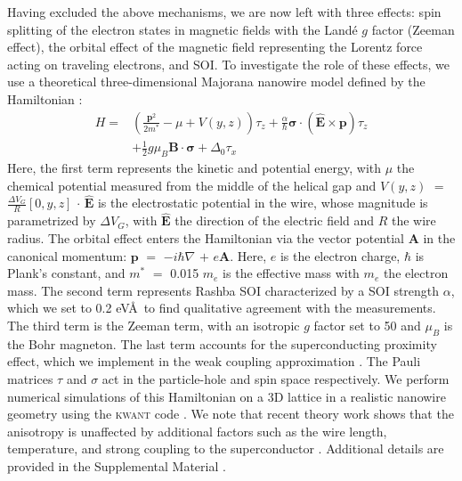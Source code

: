 Having excluded the above mechanisms, we are now left with three effects: spin splitting of the electron \mbox{states} in magnetic fields with the Land\'e $g$ factor (Zeeman eff\mbox{ect)}, the orbital effect of the magnetic field representing the Lorentz force acting on traveling electrons, and SOI.
To investigate the role of these effects, we use a theoretical three-dimensional Majorana nanowire model defined by the Hamiltonian \cite{Lutchyn2010,Oreg2010,Nijholt2016}:
\begin{equation*}
\begin{split}
H = &\left(\frac{\mathbf{p}^2}{2m^*}-\mu+V(y,z)\right) \tau_z + \frac{\alpha}{\hbar} \boldsymbol{\sigma} \cdot \mathbf{(\hat{E}\times p)} \tau_z\\
&+ \frac{1}{2}g\mu_B\mathbf{B\cdot}\boldsymbol{\sigma}+\Delta_0 \tau_x
\end{split}
\end{equation*}
Here, the first term represents the kinetic and potential energy, with $\mu$ the chemical potential measured from the middle of the helical gap and $V(y,z)$ $=$ $\frac{\Delta V_G}{R}[0,y,z]$ $\cdot$ $\mathbf{\hat{E}}$ is the electrostatic potential in the wire, whose magnitude is parametrized by $\Delta V_G$, with $\mathbf{\hat{E}}$ the direction of the electric field and $R$ the wire radius.
The orbital effect enters the Hamiltonian via the vector potential $\mathbf{A}$ in the canonical momentum: $\mathbf{p}$ $=$ $-i\hbar \nabla$ $+$ $e\mathbf{A}$.
Here, $e$ is the electron charge, $\hbar$ is Plank's constant, and $m^*$ $=$ 0.015 $m_e$ is the effective mass with $m_e$ the electron mass.
The second term represents Rashba SOI characterized by a SOI strength $\alpha$, which we set to 0.2 eV\AA\ to find qualitative agreement with the measurements.
The third term is the Zeeman term, with an isotropic $g$ factor set to 50 and $\mu_B$ is the Bohr magneton.
The last term accounts for the superconducting proximity effect, which we implement in the weak coupling approximation \cite{Nijholt2016}.
The Pauli matrices $\tau$ and $\sigma$ act in the particle-hole and spin space respectively.
We perform numerical simulations of this Hamiltonian on a 3D lattice in a realistic nanowire geometry using the \textsc{kwant} code \cite{Groth2014}.
We note that recent theory work shows that the anisotropy is unaffected by additional factors such as the wire length, temperature, and strong coupling to the superconductor \cite{Liu2019}.
Additional details are provided in the Supplemental Material \cite{Note1}.

